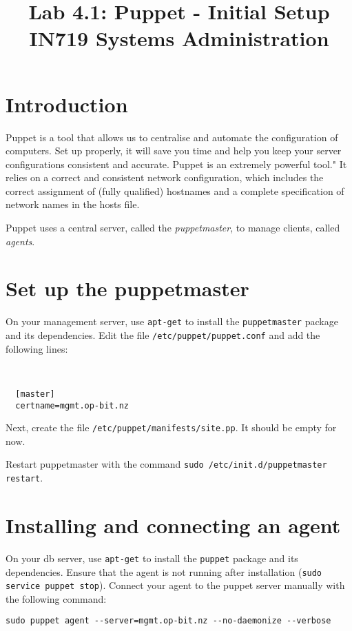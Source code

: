 \documentclass{article}
\begin{document}
\title{Lab 4.1: Puppet - Initial Setup \\ IN719 Systems Administration}
\date{}
\maketitle

\section*{Introduction}
Puppet is a tool that allows us to centralise and automate the configuration of computers.  Set up properly, it will save you time and help you keep your server configurations consistent and accurate.  Puppet is an extremely powerful tool." It relies on a correct and consistent network configuration, which includes the correct assignment of (fully qualified) hostnames and a complete specification of network names in the hosts file.

Puppet uses a central server, called the \emph{puppetmaster}, to manage clients, called \emph{agents}.

\section{Set up the puppetmaster}
On your management server, use \texttt{apt-get} to install the \texttt{puppetmaster} package and its dependencies.  Edit the file \texttt{/etc/puppet/puppet.conf} and add the following lines:

\
\begin{verbatim}
  [master]
  certname=mgmt.op-bit.nz
\end{verbatim}

Next, create the file \texttt{/etc/puppet/manifests/site.pp}.  It should be empty for now.

Restart puppetmaster with the command \texttt{sudo /etc/init.d/puppetmaster restart}.

\section{Installing and connecting an agent}
On your db server, use \texttt{apt-get} to install the \texttt{puppet} package and its dependencies. Ensure that the agent is not running after installation (\texttt{sudo service puppet stop}). Connect your agent to the puppet server manually with the following command:

\begin{verbatim}
sudo puppet agent --server=mgmt.op-bit.nz --no-daemonize --verbose
\end{verbatim}
\end{document}
